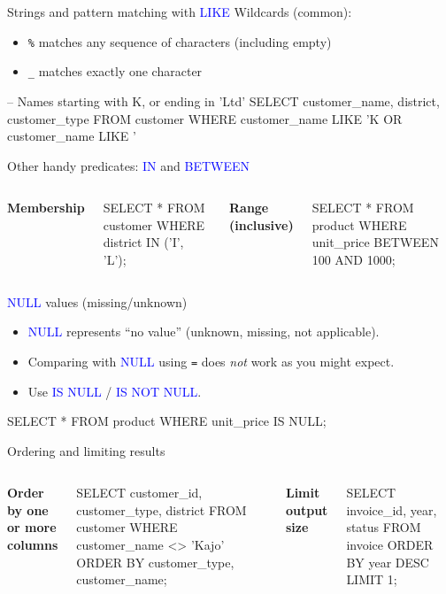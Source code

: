 \documentclass[10pt,aspectratio=169]{beamer}
\newcommand{\sqlk}[1]{\textcolor{blue}{#1}}
\begin{document}
\begin{frame}[fragile]{Strings and pattern matching with \sqlk{LIKE}}
Wildcards (common):
\begin{itemize}
  \item \texttt{\%} matches any sequence of characters (including empty)
  \item \texttt{\_} matches exactly one character
\end{itemize}
\vspace{0.6em}
\begin{codesql}
-- Names starting with K, or ending in 'Ltd'
SELECT customer_name, district, customer_type
FROM   customer
WHERE  customer_name LIKE 'K%
   OR  customer_name LIKE '%
\end{codesql}
\end{frame}

\begin{frame}[fragile]{Other handy predicates: \sqlk{IN} and \sqlk{BETWEEN}}
\begin{columns}[T,onlytextwidth]
\textbf{Membership}
\begin{codesql}
SELECT *
FROM   customer
WHERE  district IN ('I', 'L');
\end{codesql}
\textbf{Range (inclusive)}
\begin{codesql}
SELECT *
FROM   product
WHERE  unit_price BETWEEN 100 AND 1000;
\end{codesql}
\end{columns}
\end{frame}

\begin{frame}[fragile]{\sqlk{NULL} values (missing/unknown)}
\begin{itemize}
  \item \sqlk{NULL} represents ``no value'' (unknown, missing, not applicable).
  \item Comparing with \sqlk{NULL} using \texttt{=} does \emph{not} work as you might expect.
  \item Use \sqlk{IS NULL} / \sqlk{IS NOT NULL}.
\end{itemize}
\vspace{0.6em}
\begin{codesql}
SELECT *
FROM   product
WHERE  unit_price IS NULL;
\end{codesql}
\end{frame}

\begin{frame}[fragile]{Ordering and limiting results}
\begin{columns}[T,onlytextwidth]
\textbf{Order by one or more columns}
\begin{codesql}
SELECT customer_id, customer_type, district
FROM   customer
WHERE  customer_name <> 'Kajo'
ORDER BY customer_type, customer_name;
\end{codesql}
\textbf{Limit output size}
\begin{codesql}
SELECT invoice_id, year, status
FROM   invoice
ORDER BY year DESC
LIMIT  1;
\end{codesql}
\end{columns}
\end{frame}
\end{document}
